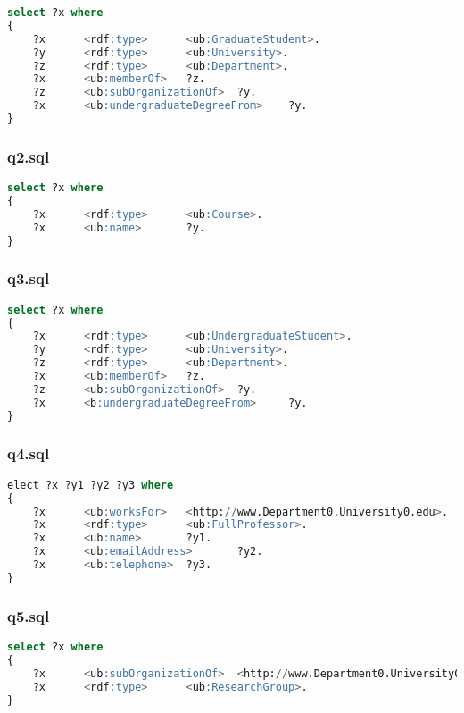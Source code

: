\documentclass[titlepage, a4paper, 12pt] {article}
\begin{document}
\begin{lstlisting}[language=SQL]
select ?x where
{
	?x      <rdf:type>      <ub:GraduateStudent>.
	?y      <rdf:type>      <ub:University>.
	?z      <rdf:type>      <ub:Department>.
	?x      <ub:memberOf>   ?z.
	?z      <ub:subOrganizationOf>  ?y.
	?x      <ub:undergraduateDegreeFrom>    ?y.
}
\end{lstlisting}

\subsubsection{q2.sql}

\begin{lstlisting}[language=SQL]
select ?x where
{
	?x      <rdf:type>      <ub:Course>.
	?x      <ub:name>       ?y.
}  
\end{lstlisting}

\subsubsection{q3.sql}

\begin{lstlisting}[language=SQL]
select ?x where
{
	?x      <rdf:type>      <ub:UndergraduateStudent>.
	?y      <rdf:type>      <ub:University>.
	?z      <rdf:type>      <ub:Department>.
	?x      <ub:memberOf>   ?z.
	?z      <ub:subOrganizationOf>  ?y.
	?x      <b:undergraduateDegreeFrom>     ?y.
}
\end{lstlisting}

\subsubsection{q4.sql}

\begin{lstlisting}[language=SQL]
elect ?x ?y1 ?y2 ?y3 where
{
	?x      <ub:worksFor>   <http://www.Department0.University0.edu>.
	?x      <rdf:type>      <ub:FullProfessor>.
	?x      <ub:name>       ?y1.
	?x      <ub:emailAddress>       ?y2.
	?x      <ub:telephone>  ?y3.
}
\end{lstlisting}

\subsubsection{q5.sql}

\begin{lstlisting}[language=SQL]
select ?x where
{
	?x      <ub:subOrganizationOf>  <http://www.Department0.University0.edu>.
	?x      <rdf:type>      <ub:ResearchGroup>.
}
\end{lstlisting}
\end{document}
